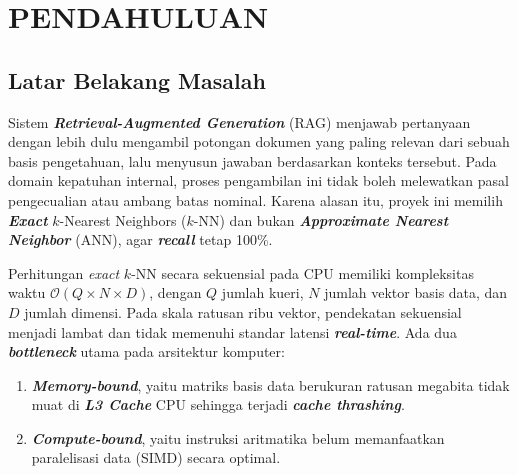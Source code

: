 \documentclass[12pt,a4paper,oneside]{report}
\newcommand{\keyword}[1]{\textbf{\textit{#1}}}
\begin{document}
\setcounter{page}{1}
\pagestyle{plain}

\begingroup
\setlength{\parskip}{0pt}
\renewcommand{\addvspace}[1]{}
\tableofcontents
\endgroup

\clearpage
\begingroup
\setlength{\parskip}{0pt}
\listoftables
\endgroup

\clearpage
\begingroup
\setlength{\parskip}{0pt}
\listoffigures
\endgroup

\clearpage
\pagestyle{fancy}
\setcounter{page}{1}

\chapter{PENDAHULUAN}

\section{Latar Belakang Masalah}

Sistem \keyword{Retrieval-Augmented Generation} (RAG) menjawab pertanyaan dengan lebih dulu mengambil potongan dokumen yang paling relevan dari sebuah basis pengetahuan, lalu menyusun jawaban berdasarkan konteks tersebut. Pada domain kepatuhan internal, proses pengambilan ini tidak boleh melewatkan pasal pengecualian atau ambang batas nominal. Karena alasan itu, proyek ini memilih \keyword{Exact} $k$-Nearest Neighbors ($k$-NN) dan bukan \keyword{Approximate Nearest Neighbor} (ANN), agar \keyword{recall} tetap 100\%.

Perhitungan \textit{exact} $k$-NN secara sekuensial pada CPU memiliki kompleksitas waktu $\mathcal{O}(Q \times N \times D)$, dengan $Q$ jumlah kueri, $N$ jumlah vektor basis data, dan $D$ jumlah dimensi. Pada skala ratusan ribu vektor, pendekatan sekuensial menjadi lambat dan tidak memenuhi standar latensi \keyword{real-time}. Ada dua \keyword{bottleneck} utama pada arsitektur komputer:

\begin{enumerate}[label=(\arabic*),leftmargin=2.2em]
  \item \keyword{Memory-bound}, yaitu matriks basis data berukuran ratusan megabita tidak muat di \keyword{L3 Cache} CPU sehingga terjadi \keyword{cache thrashing}.
  \item \keyword{Compute-bound}, yaitu instruksi aritmatika belum memanfaatkan paralelisasi data (SIMD) secara optimal.
\end{enumerate}
\end{document}
